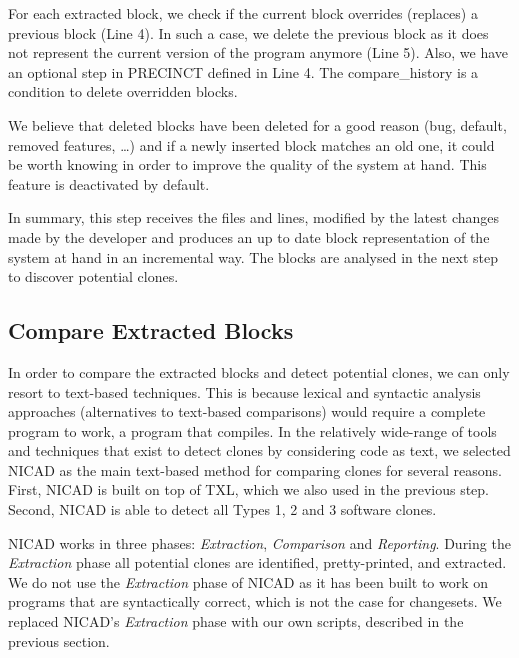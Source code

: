 \documentclass[conference]{IEEEtran}
\begin{document}
For each extracted block, we check if the current block overrides (replaces) a previous block (Line 4).
In such a case, we delete the previous block as it does not represent the current version of the program anymore (Line 5).
Also, we have an optional step in PRECINCT defined in Line 4. The compare\_history is a condition to delete overridden blocks.

We believe that deleted blocks have been deleted for a good reason (bug, default, removed features, \ldots) and if a newly inserted block matches an old one, it could be worth knowing in order to improve the quality of the system at hand.
This feature is deactivated by default.

In summary, this step receives the files and lines, modified by the latest changes made by the developer and produces an up to date block representation of the system at hand in an incremental way.
The blocks are analysed in the next step to discover potential clones.

\subsection{Compare Extracted Blocks}
\label{sub:Compare Extracted Blocks}

In order to compare the extracted blocks and detect potential clones, we can only resort to text-based techniques.
This is because lexical and syntactic analysis approaches (alternatives to text-based comparisons) would require a complete program to work, a program that compiles.
In the relatively wide-range of tools and techniques that exist to detect clones by considering code as text\cite{Johnson1993,Johnson1994,Marcus,Manber1994,StephaneDucasse,Wettel2005}, we selected NICAD as the main text-based method for comparing clones \cite{Cordy2011} for several reasons.
First, NICAD is built on top of TXL, which we also used in the previous step.
Second, NICAD is able to detect all Types 1, 2 and 3 software clones.

NICAD  works in three phases: \textit{Extraction}, \textit{Comparison} and \textit{Reporting}. During the \textit{Extraction} phase all potential clones are identified, pretty-printed, and extracted.
We do not use the \textit{Extraction} phase of NICAD as it has been built to work on programs that are syntactically correct, which is not the case for changesets.
We replaced NICAD's \textit{Extraction} phase with our own scripts, described in the previous section.
\end{document}
